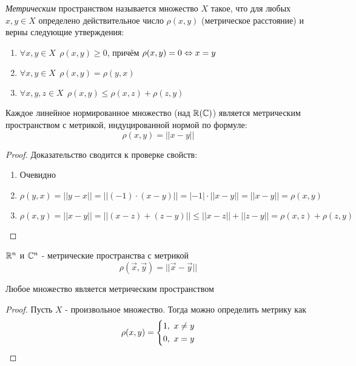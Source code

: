 \begin{definition}
	\textit{Метрическим} пространством называется множество $X$ такое, что для любых $x, y \in X$ определено действительное число $\rho(x, y)$ (метрическое расстояние) и верны следующие утверждения:
	\begin{enumerate}
		\item $\forall x, y \in X\ \ \rho(x, y) \ge 0$, причём $\rho(x, y) = 0 \Leftrightarrow x = y$
		
		\item $\forall x, y \in X\ \ \rho(x, y) = \rho(y, x)$
		
		\item $\forall x, y, z \in X\ \ \rho(x, y) \le \rho(x, z) + \rho(z, y)$
	\end{enumerate}
\end{definition}

\begin{theorem}
	Каждое линейное нормированное множество (над $\mathbb{R}(\mathbb{C})$) является метрическим пространством с метрикой, индуцированной нормой по формуле:
	\[
		\rho(x, y) = ||x - y||
	\]
\end{theorem}

\begin{proof}
	Доказательство сводится к проверке свойств:
	\begin{enumerate}
		\item Очевидно
		
		\item
		\[
			\rho(y, x) = ||y - x|| = ||(-1) \cdot (x - y)|| = |-1| \cdot ||x - y|| = ||x - y|| = \rho(x, y)
		\]
		
		\item 
		\[
			\rho(x, y) = ||x - y|| = ||(x - z) + (z - y)|| \le ||x - z|| + ||z - y|| = \rho(x, z) + \rho(z, y)
		\]
	\end{enumerate}
\end{proof}

\begin{corollary}
	$\mathbb{R}^n$ и $\mathbb{C}^n$ - метрические пространства с метрикой
	\[
	\rho(\vec{x}, \vec{y}) = ||\vec{x} - \vec{y}||
	\]
\end{corollary}

\begin{proposition}
	Любое множество является метрическим пространством
\end{proposition}

\begin{proof}
	Пусть $X$ - произвольное множество. Тогда можно определить метрику как
	\[
		\rho(x, y) = \left\{\begin{aligned}
			&{1,\ x \neq y}
			\\
			&{0,\ x = y}
		\end{aligned}\right.
	\]
\end{proof}

